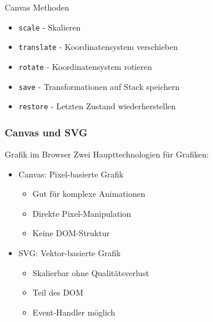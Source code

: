 \begin{code}{Canvas Methoden}
  \begin{itemize}
    \item \texttt{scale} - Skalieren
    \item \texttt{translate} - Koordinatensystem verschieben
    \item \texttt{rotate} - Koordinatensystem rotieren
    \item \texttt{save} - Transformationen auf Stack speichern
    \item \texttt{restore} - Letzten Zustand wiederherstellen
  \end{itemize}  
\end{code}

\subsubsection{Canvas und SVG}

\begin{concept}{Grafik im Browser}
    Zwei Haupttechnologien für Grafiken:
    \begin{itemize}
        \item Canvas: Pixel-basierte Grafik
            \begin{itemize}
                \item Gut für komplexe Animationen
                \item Direkte Pixel-Manipulation
                \item Keine DOM-Struktur
            \end{itemize}
        \item SVG: Vektor-basierte Grafik
            \begin{itemize}
                \item Skalierbar ohne Qualitätsverlust
                \item Teil des DOM
                \item Event-Handler möglich
            \end{itemize}
    \end{itemize}
\end{concept}

